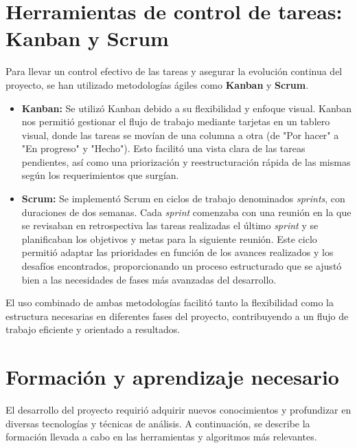 
\section{Herramientas de control de tareas: Kanban y Scrum}

Para llevar un control efectivo de las tareas y asegurar la evolución continua del proyecto, se han utilizado metodologías ágiles como \textbf{Kanban} y \textbf{Scrum}.

\begin{itemize}
    \item \textbf{Kanban:} Se utilizó Kanban debido a su flexibilidad y enfoque visual. Kanban nos permitió gestionar el flujo de trabajo mediante tarjetas en un tablero visual, donde las tareas se movían de una columna a otra (de "Por hacer" a "En progreso" y "Hecho"). Esto facilitó una vista clara de las tareas pendientes, así como una priorización y reestructuración rápida de las mismas según los requerimientos que surgían.
    
    \item \textbf{Scrum:} Se implementó Scrum en ciclos de trabajo denominados \textit{sprints}, con duraciones de dos semanas. Cada \textit{sprint} comenzaba con una reunión en la que se revisaban en retrospectiva las tareas realizadas el último \textit{sprint} y se planificaban los objetivos y metas para la siguiente reunión. Este ciclo permitió adaptar las prioridades en función de los avances realizados y los desafíos encontrados, proporcionando un proceso estructurado que se ajustó bien a las necesidades de fases más avanzadas del desarrollo.
\end{itemize}

El uso combinado de ambas metodologías facilitó tanto la flexibilidad como la estructura necesarias en diferentes fases del proyecto, contribuyendo a un flujo de trabajo eficiente y orientado a resultados.

\section{Formación y aprendizaje necesario}

El desarrollo del proyecto requirió adquirir nuevos conocimientos y profundizar en diversas tecnologías y técnicas de análisis. A continuación, se describe la formación llevada a cabo en las herramientas y algoritmos más relevantes.

